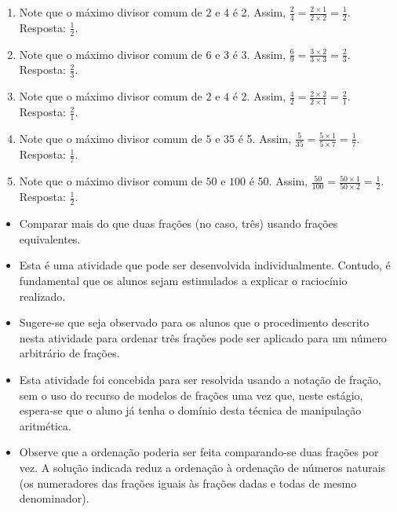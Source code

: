 \begin{multicols}{2}
\begin{solucao}{}{}
\begin{enumerate}
 \item Note que o máximo divisor comum de   $2$   e   $4$   é 2. Assim,
$\frac{2}{4} = \frac{2 \times 1}{2 \times 2} = \frac{1}{2}$. Resposta:
$\frac{1}{2}$.
 \item Note que o máximo divisor comum de   $6$   e   $3$   é 3. Assim,
$\frac{6}{9} = \frac{3 \times 2}{3 \times 3} = \frac{2}{3}$. Resposta:
$\frac{2}{3}$.
 \item Note que o máximo divisor comum de   $2$   e   $4$   é 2. Assim,
$\frac{4}{2} = \frac{2 \times 2}{2 \times 1} = \frac{2}{1}$. Resposta:
$\frac{2}{1}$.
 \item Note que o máximo divisor comum de   $5$   e   $35$   é 5. Assim,
$\frac{5}{35} = \frac{5 \times 1}{5 \times 7} = \frac{1}{7}$. Resposta:
$\frac{1}{7}$.
 \item Note que o máximo divisor comum de   $50$   e   $100$   é 50. Assim,
$\frac{50}{100} = \frac{50 \times 1}{50 \times 2} = \frac{1}{2}$. Resposta:
$\frac{1}{2}$.
\end{enumerate}

\end{solucao}



\begin{objetivos}[label=chap4-ativ18]{}{}
\begin{itemize} %
    \item       Comparar mais do que duas frações (no caso, três) usando frações
equivalentes.
\end{itemize} %
\end{objetivos}

\begin{orientacoes}{}{}
\begin{itemize} %
    \item       Esta é uma atividade que pode ser desenvolvida individualmente.
Contudo, é fundamental que os alunos sejam estimulados a explicar o raciocínio
realizado.
    \item       Sugere-se que seja observado para os alunos que o procedimento
descrito nesta atividade para ordenar três frações pode ser aplicado para um
número arbitrário de frações.
    \item       Esta atividade foi concebida para ser resolvida usando a notação
de fração, sem o uso do recurso de modelos de frações uma vez que, neste
estágio, espera-se que o aluno já tenha o domínio desta técnica de manipulação
aritmética.
    \item       Observe que a ordenação poderia ser feita comparando-se duas
frações por vez. A solução indicada reduz a ordenação à ordenação de números
naturais (os numeradores das frações iguais às frações dadas e todas de mesmo
denominador).
\end{itemize} %



\end{orientacoes}
\end{multicols}

